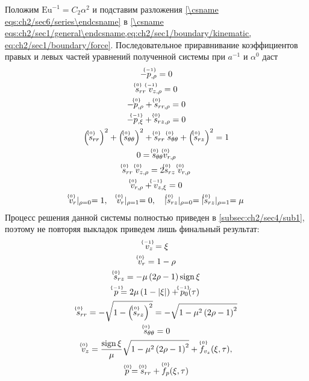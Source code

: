 Положим $\text{Eu}^{-1} = C_2 \alpha^2$ и подставим разложения \cref{\csname eqs:ch2/sec6/series\endcsname} в \cref{\csname eqs:ch2/sec1/general\endcsname,eq:ch2/sec1/boundary/kinematic, eq:ch2/sec1/boundary/force}. Последовательное приравнивание коэффициентов правых и левых частей уравнений полученной системы при $a^{-1}$ и $\alpha^0$ даст
\begin{gather}
  \label{eqs:ch2/sec6/sub1/-1/motion:2}
  -\uindex{p}{-1}_{,\rho} = 0
  \\
  \label{eqs:ch2/sec6/sub1/-1/coax:2}
  \uindex{s}{0}_{rr} \; \uindex{v}{-1}_{z,\rho} = 0
  \\
  \label{eqs:ch2/sec6/sub1/0/motion:1}
  -\uindex{p}{0}_{,\rho}+\uindex{s}{0}_{rr,\rho} = 0
  \\
  \label{eqs:ch2/sec6/sub1/0/motion:2}
  -\uindex{p}{-1}_{,\xi} + \uindex{s}{0}_{rz,\rho} = 0
  \\
  \label{eqs:ch2/sec6/sub1/0/plasticity}
  \left(\uindex{s}{0}_{rr}\right)^2 + \left(\uindex{s}{0}_{\theta\theta}\right)^2 + \uindex{s}{0}_{rr}\; \uindex{s}{0}_{\theta\theta} + \left(\uindex{s}{0}_{rz}\right)^2 = 1
  \\
  \label{eqs:ch2/sec6/sub1/0/coax:1}
  0 = \uindex{s}{0}_{\theta\theta} \uindex{v}{0}_{r,\rho}
  \\
  \label{eqs:ch2/sec6/sub1/0/coax:2}
  \uindex{s}{0}_{rr} \; \uindex{v}{0}_{z,\rho} = 2 \uindex{s}{0}_{rz} \; \uindex{v}{0}_{r,\rho}
  \\
  \label{eqs:ch2/sec6/sub1/0/uncompress}
  \uindex{v}{0}_{r,\rho} + \uindex{v}{-1}_{z,\xi} = 0
  \\
  \label{eq:ch2/sec6/sub1/boundary/0}
  \uindex{v}{0}_{r}\lvert_{\rho=0} = 1,\quad \uindex{v}{0}_{r}\lvert_{\rho=1} = 0, \quad \lvert \uindex{s}{0}_{rz}\lvert_{\rho=0} = \lvert \uindex{s}{0}_{rz}\lvert_{\rho=1} = \mu
\end{gather}
Процесс решения данной системы полностью приведен в \cref{subsec:ch2/sec4/sub1}, поэтому не повторяя выкладок приведем лишь финальный результат:
\begingroup
\allowdisplaybreaks
\begin{gather}
  \label{sol:ch2/sec6/sub1/vz/-1}
  \uindex{v}{-1}_{z} = \xi
  \\
  \label{sol:ch2/sec6/sub1/vr/0}
  \uindex{v}{0}_{r} =  1 - \rho
  \\
  \label{sol:ch2/sec6/sub1/srz/0}
  \uindex{s}{0}_{rz} = -\mu \left(2\rho - 1\right) \sign \xi
  \\
  \label{sol:ch2/sec6/sub1/p/-1}
  \uindex{p}{-1} = 2\mu\left(1-\lvert\xi\rvert\right) + \uindex{p}{-1}_{0}(\tau)
  \\
  \label{sol:ch2/sec6/sub1/srr/0}
  \uindex{s}{0}_{rr} = -\sqrt{1-\left(\uindex{s}{0}_{rz}\right)^2} = -\sqrt{1-\mu^2\left(2\rho-1\right)^2}
  \\
  \label{sol:ch2/sec6/sub1/stt/0}
  \uindex{s}{0}_{\theta\theta} = 0
  \\
  \label{sol:ch2/sec6/sub1/vz/0}
  \uindex{v}{0}_{z} = \frac{\sign\xi}{\mu}\sqrt{1-\mu^2\left(2\rho-1\right)^2} + \uindex{f}{0}_{v_{z}}(\xi,\tau),
  \\
  \label{sol:ch2/sec6/sub1/p/0}
  \uindex{p}{0} = \uindex{s}{0}_{rr} +\uindex{f}{0}_{p}(\xi,\tau)
\end{gather}
\endgroup

